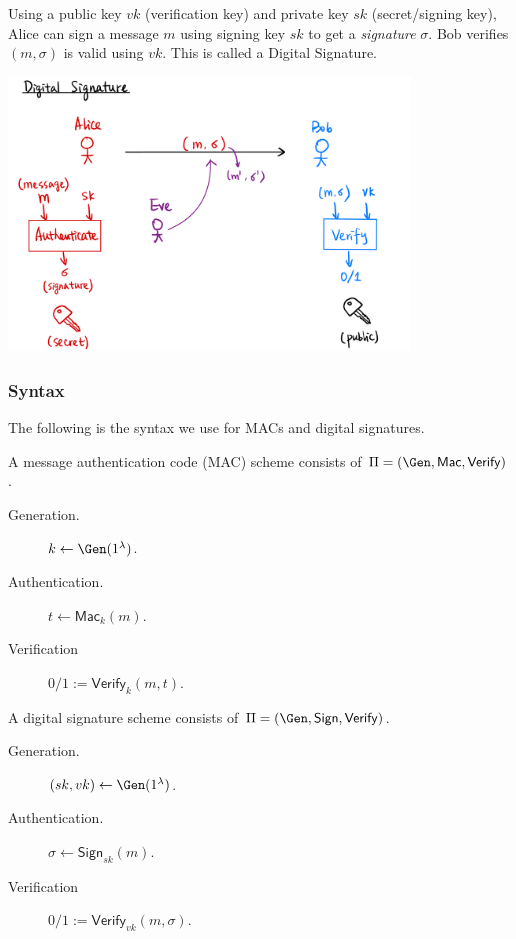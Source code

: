 Using a public key $vk$ (verification key) and private key $sk$ (secret/signing key), Alice can sign a message $m$ using signing key $sk$ to get a \emph{signature} $\sigma$. Bob verifies $(m, \sigma)$ is valid using $vk$. This is called a Digital Signature.

\begin{center}
    \includegraphics[width=0.8\textwidth]{images/2023-02-02/signature.png}
\end{center}

\subsubsection{Syntax}\label{sec:message-integrity:syntax}
The following is the syntax we use for MACs and digital signatures.

A message authentication code (MAC) scheme consists of $\Pi = (\Gen, \mathsf{Mac}, \mathsf{Verify})$.
\begin{description}
    \item[Generation.] $k\leftarrow \Gen(1^\lambda)$.
    \item[Authentication.] $t \leftarrow \mathsf{Mac}_k(m)$.
    \item[Verification] $0/1 := \mathsf{Verify}_k(m, t)$.
\end{description}

A digital signature scheme consists of $\Pi = (\Gen, \mathsf{Sign}, \mathsf{Verify})$.
\begin{description}
    \item[Generation.] $(sk, vk)\leftarrow \Gen(1^\lambda)$.
    \item[Authentication.] $\sigma \leftarrow \mathsf{Sign}_{sk}(m)$.
    \item[Verification] $0/1 := \mathsf{Verify}_{vk}(m, \sigma)$.
\end{description}

